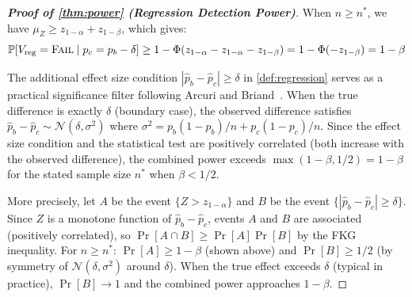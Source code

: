 \begin{proof}[\textbf{Proof of \cref{thm:power} (Regression Detection Power)}]
When $n \geq n^*$, we have $\mu_Z \geq z_{1-\alpha} + z_{1-\beta}$,
which gives:
\begin{equation}
  \mathbb{P}[V_{\text{reg}} = \textsc{Fail} \mid p_c = p_b - \delta]
  \geq 1 - \Phi(z_{1-\alpha} - z_{1-\alpha} - z_{1-\beta})
  = 1 - \Phi(-z_{1-\beta})
  = 1 - \beta
\end{equation}

The additional effect size condition $|\hat{p}_b - \hat{p}_c| \geq
\delta$ in \cref{def:regression} serves as a practical significance
filter following Arcuri and Briand~\citep{arcuri2011practical}. When
the true difference is exactly $\delta$ (boundary case), the observed
difference satisfies $\hat{p}_b - \hat{p}_c \sim \mathcal{N}(\delta,
\sigma^2)$ where $\sigma^2 = p_b(1-p_b)/n + p_c(1-p_c)/n$. Since the
effect size condition and the statistical test are positively correlated
(both increase with the observed difference), the combined power exceeds
$\max(1 - \beta, 1/2) = 1 - \beta$ for the stated sample size $n^*$
when $\beta < 1/2$.

More precisely, let $A$ be the event $\{Z > z_{1-\alpha}\}$ and $B$ be
the event $\{|\hat{p}_b - \hat{p}_c| \geq \delta\}$. Since $Z$ is a
monotone function of $\hat{p}_b - \hat{p}_c$, events $A$ and $B$ are
associated (positively correlated), so $\Pr[A \cap B] \geq
\Pr[A]\Pr[B]$ by the FKG inequality. For $n \geq n^*$:
$\Pr[A] \geq 1 - \beta$ (shown above) and $\Pr[B] \geq 1/2$ (by
symmetry of $\mathcal{N}(\delta, \sigma^2)$ around $\delta$). When the
true effect exceeds $\delta$ (typical in practice), $\Pr[B] \to 1$ and
the combined power approaches $1 - \beta$.
\qedhere
\end{proof}


